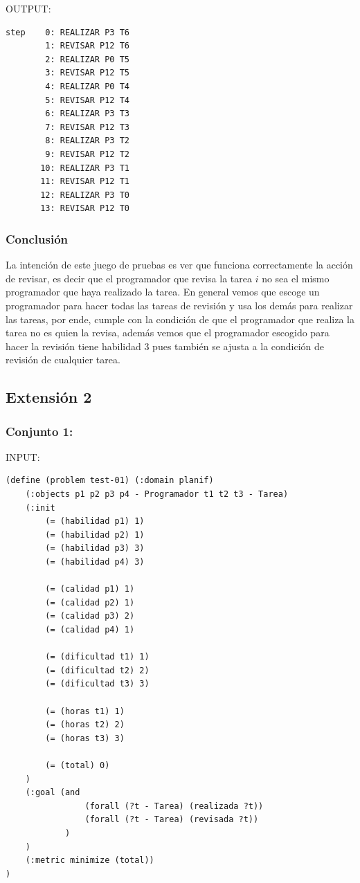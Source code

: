 \documentclass[12pt, titlepage]{article}
\begin{document}
OUTPUT:
\begin{lstlisting}
step    0: REALIZAR P3 T6
        1: REVISAR P12 T6
        2: REALIZAR P0 T5
        3: REVISAR P12 T5
        4: REALIZAR P0 T4
        5: REVISAR P12 T4
        6: REALIZAR P3 T3
        7: REVISAR P12 T3
        8: REALIZAR P3 T2
        9: REVISAR P12 T2
       10: REALIZAR P3 T1
       11: REVISAR P12 T1
       12: REALIZAR P3 T0
       13: REVISAR P12 T0
\end{lstlisting}

\subsubsection{Conclusión}

La intención de este juego de pruebas es ver que funciona correctamente la acción de revisar, es decir que el programador que revisa la tarea $i$ no sea el mismo programador que haya realizado la tarea. En general vemos que escoge un programador para hacer todas las tareas de revisión y usa los demás para realizar las tareas, por ende, cumple con la condición de que el programador que realiza la tarea no es quien la revisa, además vemos que el programador escogido para hacer la revisión tiene habilidad 3 pues también se ajusta a la condición de revisión de cualquier tarea.

\subsection{Extensión 2}

\subsubsection*{Conjunto 1:}

INPUT:
\begin{lstlisting}[language=PDDL]
(define (problem test-01) (:domain planif)
    (:objects p1 p2 p3 p4 - Programador t1 t2 t3 - Tarea)
    (:init
        (= (habilidad p1) 1)
        (= (habilidad p2) 1)
        (= (habilidad p3) 3)
        (= (habilidad p4) 3)
        
        (= (calidad p1) 1)
        (= (calidad p2) 1)
        (= (calidad p3) 2)
        (= (calidad p4) 1)
        
        (= (dificultad t1) 1)
        (= (dificultad t2) 2)
        (= (dificultad t3) 3)
        
        (= (horas t1) 1)
        (= (horas t2) 2)
        (= (horas t3) 3)

        (= (total) 0)
    )
    (:goal (and
                (forall (?t - Tarea) (realizada ?t))
                (forall (?t - Tarea) (revisada ?t))
            )
    )
    (:metric minimize (total))
)
\end{lstlisting}
\end{document}
